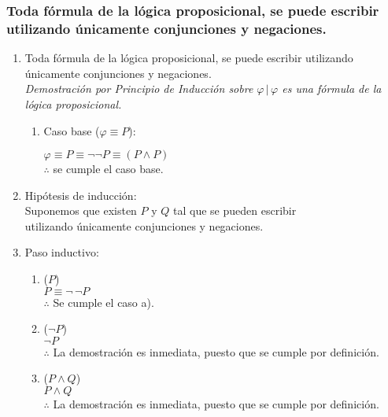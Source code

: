 \documentclass[11pt,letterpaper]{article}
\begin{document}
         \subsubsection{Toda fórmula de la lógica proposicional, se puede escribir utilizando únicamente conjunciones y negaciones.}
         \begin{enumerate}

         \item Toda fórmula de la lógica proposicional, se puede escribir
           utilizando únicamente conjunciones y negaciones. \\
           \emph{Demostración por Principio de Inducción sobre $ \varphi \, | \, \varphi $ es una fórmula de la lógica proposicional.}

           \begin{enumerate}

           \item Caso base ($ \varphi \equiv P $):

             $ \varphi \equiv P \equiv \neg \neg P \equiv (P \wedge P) $ \\
               $ \therefore $ se cumple el caso base.

           \end{enumerate}

         \item Hipótesis de inducción: \\
           Suponemos que existen $ P $ y $ Q $ tal que se pueden escribir \\
           utilizando únicamente conjunciones y negaciones.

         \item Paso inductivo:

           \begin{enumerate}

           \item ($ P $)\\
             $ P \equiv \neg \, \neg P $\\
             $ \therefore $ Se cumple el caso a).

           \item ($ \neg P $)\\
             $ \neg P $ \\
             $ \therefore $ La demostración es inmediata, puesto que se cumple por definición.

           \item ($ P \wedge Q $)\\
             $ P \wedge Q $ \\
             $ \therefore $ La demostración es inmediata, puesto que se cumple por definición.


\end{enumerate}
\end{enumerate}
\end{document}
